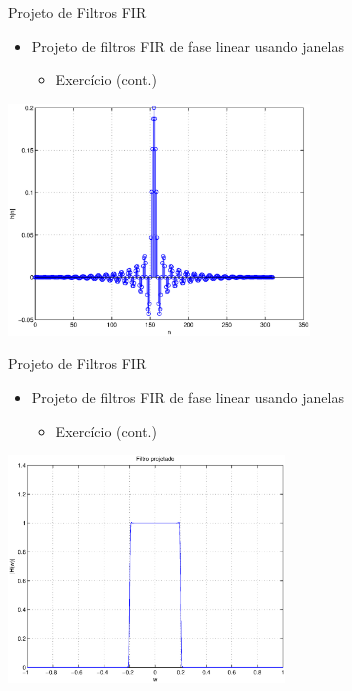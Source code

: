 \begin{slide}{Projeto de Filtros FIR}
\begin{itemize}
   \item  Projeto de filtros FIR de fase linear usando janelas 
   \begin{itemize}
      \item Exercício (cont.)
    \end{itemize}
\end{itemize}
\includegraphics[width=0.6\textwidth]{figs/janelada.eps}
\end{slide}


\begin{slide}{Projeto de Filtros FIR}
\begin{itemize}
   \item  Projeto de filtros FIR de fase linear usando janelas 
   \begin{itemize}
      \item Exercício (cont.)
    \end{itemize}
\end{itemize}
\includegraphics[width=0.55\textwidth]{figs/H.eps}
\end{slide}

